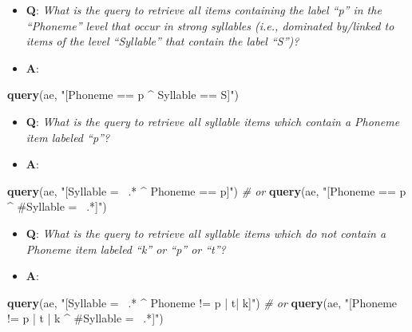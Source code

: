 \documentclass[]{book}
\newenvironment{Shaded}{\begin{snugshade}}{\end{snugshade}}
\newcommand{\CommentTok}[1]{\textcolor[rgb]{0.56,0.35,0.01}{\textit{#1}}}
\newcommand{\KeywordTok}[1]{\textcolor[rgb]{0.13,0.29,0.53}{\textbf{#1}}}
\newcommand{\NormalTok}[1]{#1}
\newcommand{\StringTok}[1]{\textcolor[rgb]{0.31,0.60,0.02}{#1}}
\providecommand{\tightlist}{%
  \setlength{\itemsep}{0pt}\setlength{\parskip}{0pt}}
\theoremstyle{definition}
\theoremstyle{definition}
\theoremstyle{definition}
\theoremstyle{remark}
\begin{document}
\begin{itemize}
\tightlist
\item
  \textbf{Q}: \emph{What is the query to retrieve all items containing
  the label ``p'' in the ``Phoneme'' level that occur in strong
  syllables (i.e., dominated by/linked to items of the level
  ``Syllable'' that contain the label ``S'')?}
\item
  \textbf{A}:
\end{itemize}

\begin{Shaded}
\begin{Highlighting}[]
\KeywordTok{query}\NormalTok{(ae, }\StringTok{"[Phoneme == p ^ Syllable == S]"}\NormalTok{)}
\end{Highlighting}
\end{Shaded}

\begin{itemize}
\tightlist
\item
  \textbf{Q}: \emph{What is the query to retrieve all syllable items
  which contain a Phoneme item labeled ``p''?}
\item
  \textbf{A}:
\end{itemize}

\begin{Shaded}
\begin{Highlighting}[]
\KeywordTok{query}\NormalTok{(ae, }\StringTok{"[Syllable =~ .* ^ Phoneme == p]"}\NormalTok{) }
\CommentTok{# or }
\KeywordTok{query}\NormalTok{(ae, }\StringTok{"[Phoneme == p ^ #Syllable =~ .*]"}\NormalTok{)}
\end{Highlighting}
\end{Shaded}

\begin{itemize}
\tightlist
\item
  \textbf{Q}: \emph{What is the query to retrieve all syllable items
  which do not contain a Phoneme item labeled ``k'' or ``p'' or ``t''?}
\item
  \textbf{A}:
\end{itemize}

\begin{Shaded}
\begin{Highlighting}[]
\KeywordTok{query}\NormalTok{(ae, }\StringTok{"[Syllable =~ .* ^ Phoneme != p | t| k]"}\NormalTok{)}
\CommentTok{# or }
\KeywordTok{query}\NormalTok{(ae, }\StringTok{"[Phoneme != p | t | k ^ #Syllable =~ .*]"}\NormalTok{)}
\end{Highlighting}
\end{Shaded}
\end{document}

